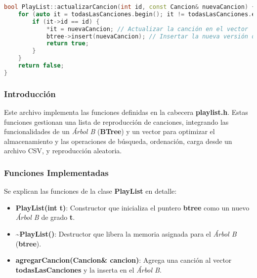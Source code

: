 \documentclass[corference]{IEEEtran}
\begin{document}
\begin{flushleft}
\begin{lstlisting}[language=C++, style=mystyle, caption={Código de la Clase Playlist}]
bool PlayList::actualizarCancion(int id, const Cancion& nuevaCancion) {
    for (auto it = todasLasCanciones.begin(); it != todasLasCanciones.end(); ++it) {
        if (it->id == id) {
            *it = nuevaCancion; // Actualizar la canción en el vector
            btree->insert(nuevaCancion); // Insertar la nueva versión de la canción en el B-Tree
            return true;
        }
    }
    return false;
}
            \end{lstlisting}

            \subsubsection{Introducción}

                \noindent\hspace*{4em}Este archivo implementa las funciones definidas en la cabecera \textbf{playlist.h}. Estas funciones gestionan una lista de reproducción de canciones, integrando las funcionalidades de un \textit{Árbol B} (\textbf{BTree}) y un vector para optimizar el almacenamiento y las operaciones de búsqueda, ordenación, carga desde un archivo CSV, y reproducción aleatoria.
                
            \subsubsection{Funciones Implementadas}
            
                \noindent\hspace*{4em}Se explican las funciones de la clase \textbf{PlayList} en detalle:
                
                \begin{itemize}[left=4em]
                
                    \item \textbf{PlayList(int t)}: Constructor que inicializa el puntero \textbf{btree} como un nuevo \textit{Árbol B} de grado \textbf{t}.
                    
                    \item \textbf{\textasciitilde PlayList()}: Destructor que libera la memoria asignada para el \textit{Árbol B} (\textbf{btree}).
                
                    \item \textbf{agregarCancion(Cancion\& cancion)}: Agrega una canción al vector \textbf{todasLasCanciones} y la inserta en el \textit{Árbol B}.
                    

\end{itemize}
\end{flushleft}
\end{document}
